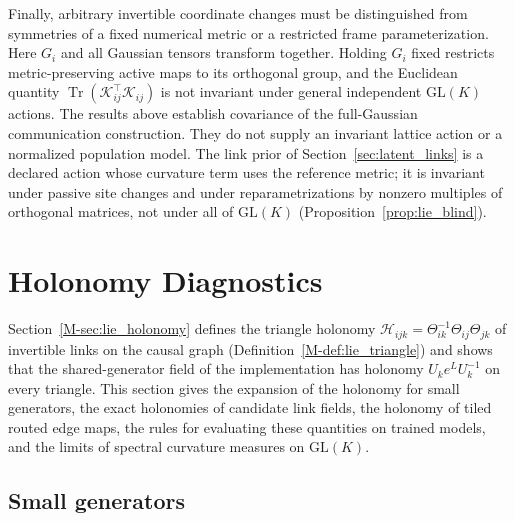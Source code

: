 \documentclass[twoside,11pt]{article}
\begin{document}
Finally, arbitrary invertible coordinate changes must be distinguished from symmetries of a fixed numerical metric or a restricted frame parameterization. Here $G_i$ and all Gaussian tensors transform together. Holding $G_i$ fixed restricts metric-preserving active maps to its orthogonal group, and the Euclidean quantity $\operatorname{Tr}(\mathcal K_{ij}^\top\mathcal K_{ij})$ is not invariant under general independent $\mathrm{GL}(K)$ actions. The results above establish covariance of the full-Gaussian communication construction. They do not supply an invariant lattice action or a normalized population model. The link prior of Section~\ref{sec:latent_links} is a declared action whose curvature term uses the reference metric; it is invariant under passive site changes and under reparametrizations by nonzero multiples of orthogonal matrices, not under all of $\mathrm{GL}(K)$ (Proposition~\ref{prop:lie_blind}).

\section{Holonomy Diagnostics}
\label{supp:holonomy}

Section~\ref{M-sec:lie_holonomy} defines the triangle holonomy $\mathcal H_{ijk}=\Theta_{ik}^{-1}\Theta_{ij}\Theta_{jk}$ of invertible links on the causal graph (Definition~\ref{M-def:lie_triangle}) and shows that the shared-generator field of the implementation has holonomy $U_ke^{L}U_k^{-1}$ on every triangle. This section gives the expansion of the holonomy for small generators, the exact holonomies of candidate link fields, the holonomy of tiled routed edge maps, the rules for evaluating these quantities on trained models, and the limits of spectral curvature measures on $\mathrm{GL}(K)$.

\subsection{Small generators}
\label{supp:holonomy_bch}
\end{document}
